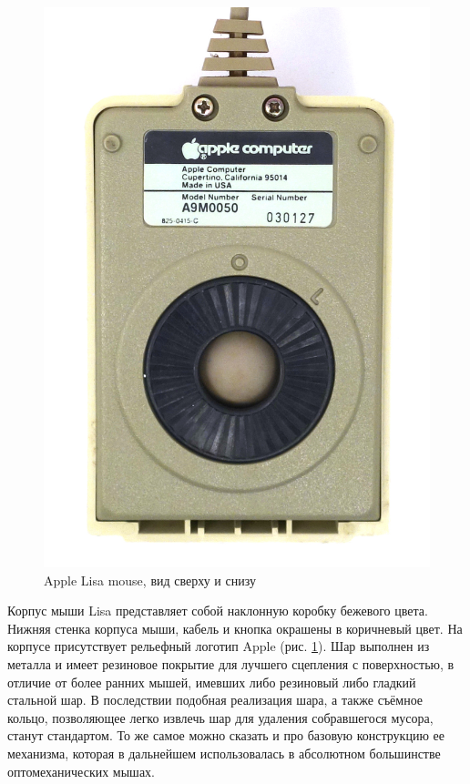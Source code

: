 \documentclass[11pt, a4paper]{article}
\begin{document}
\begin{figure}[h]
    \includegraphics[scale=0.5]{1983_apple_lisa_mouse/applebottom_60.jpg}
    \caption{Apple Lisa mouse, вид сверху и снизу}
    \label{fig:AppleLisaTopAndBottom}
\end{figure}

Корпус мыши Lisa представляет собой наклонную коробку бежевого цвета. Нижняя стенка корпуса мыши, кабель и кнопка окрашены в коричневый цвет. На корпусе присутствует рельефный логотип Apple (рис. \ref{fig:AppleLisaTopAndBottom}). Шар выполнен из металла и имеет резиновое покрытие для лучшего сцепления с поверхностью, в отличие от более ранних мышей, имевших либо резиновый либо гладкий стальной шар. В последствии подобная реализация шара, а также съёмное кольцо, позволяющее легко извлечь шар для удаления собравшегося мусора, станут стандартом. То же самое можно сказать и про базовую конструкцию ее механизма, которая в дальнейшем использовалась в абсолютном большинстве оптомеханических мышах.
\end{document}
